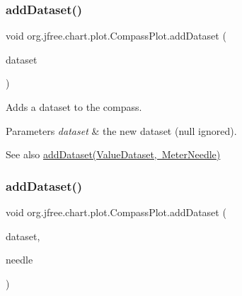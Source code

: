 \subsubsection{\texorpdfstring{add\+Dataset()}{addDataset()}\hspace{0.1cm}{\footnotesize\ttfamily [1/2]}}
{\footnotesize\ttfamily void org.\+jfree.\+chart.\+plot.\+Compass\+Plot.\+add\+Dataset (\begin{DoxyParamCaption}\item[{\mbox{\hyperlink{interfaceorg_1_1jfree_1_1data_1_1general_1_1_value_dataset}{Value\+Dataset}}}]{dataset }\end{DoxyParamCaption})}

Adds a dataset to the compass.


\begin{DoxyParams}{Parameters}
{\em dataset} & the new dataset ({\ttfamily null} ignored).\\
\hline
\end{DoxyParams}
\begin{DoxySeeAlso}{See also}
\mbox{\hyperlink{classorg_1_1jfree_1_1chart_1_1plot_1_1_compass_plot_a8250e23d802a152007f4038cbb92689b}{add\+Dataset(\+Value\+Dataset, Meter\+Needle)}} 
\end{DoxySeeAlso}
\mbox{\label{classorg_1_1jfree_1_1chart_1_1plot_1_1_compass_plot_a8250e23d802a152007f4038cbb92689b}} 
\subsubsection{\texorpdfstring{add\+Dataset()}{addDataset()}\hspace{0.1cm}{\footnotesize\ttfamily [2/2]}}
{\footnotesize\ttfamily void org.\+jfree.\+chart.\+plot.\+Compass\+Plot.\+add\+Dataset (\begin{DoxyParamCaption}\item[{\mbox{\hyperlink{interfaceorg_1_1jfree_1_1data_1_1general_1_1_value_dataset}{Value\+Dataset}}}]{dataset,  }\item[{\mbox{\hyperlink{classorg_1_1jfree_1_1chart_1_1needle_1_1_meter_needle}{Meter\+Needle}}}]{needle }\end{DoxyParamCaption})}

